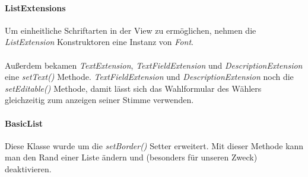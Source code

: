 \documentclass[parskip=full]{scrartcl}
\begin{document}
\paragraph{ListExtensions}
Um einheitliche Schriftarten in der View zu ermöglichen, nehmen die \textit{ListExtension} Konstruktoren eine Instanz von \textit{Font}.
\\
\\
Außerdem bekamen \textit{TextExtension}, \textit{TextFieldExtension} und \textit{DescriptionExtension} eine \textit{setText()} Methode. \textit{TextFieldExtension} und \textit{DescriptionExtension} noch die \textit{setEditable()} Methode, damit lässt sich das Wahlformular des Wählers gleichzeitig zum anzeigen seiner Stimme verwenden.

\paragraph{BasicList}
Diese Klasse wurde um die \textit{setBorder()} Setter erweitert. Mit dieser Methode kann man den Rand einer Liste ändern und (besonders für unseren Zweck) deaktivieren.


\end{document}
